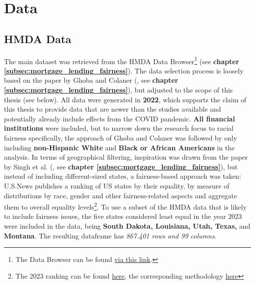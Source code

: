 \section{Data}\label{sec:Data}

\subsection{HMDA Data}\label{subsec:HMDA_Data}

The main dataset was retrieved from the HMDA Data Browser\footnote{The Data Browser can be found \href{https://ffiec.cfpb.gov/data-browser/data/2022?category=states}{via this link}.} (see \textbf{chapter \ref{subsec:mortgage_lending_fairness}}). 
The data selection process is loosely based on the paper by Ghoba and Colaner (\cite{Ghoba}, see \textbf{chapter \ref{subsec:mortgage_lending_fairness}}), but adjusted to the scope of this thesis (see below).
All data were generated in \textbf{2022}, which supports the claim of this thesis to provide data that are newer than the studies available and potentially already include effects from the COVID pandemic. \textbf{All financial institutions} were included, but to narrow down the research focus to racial fairness specifically, the approach of Ghoba and Colaner was followed by only including \textbf{non-Hispanic White} and \textbf{Black or African Americans} in the analysis. 
In terms of geographical filtering, inspiration was drawn from the paper by Singh et al. (\cite{Singh2022}, see \textbf{chapter \ref{subsec:mortgage_lending_fairness}}), but instead of including different-sized states, a fairness-based approach was taken: 
U.S.News publishes a ranking of US states by their equality, by measure of distributions by race, gender and other fairness-related aspects and aggregate them to overall equality levels\footnote{The 2023 ranking can be found \href{https://www.usnews.com/news/best-states/rankings/opportunity/equality?sort=rank-desc}{here}, the corresponding methodology \href{https://www.usnews.com/news/best-states/articles/methodology}{here}}. 
To use a subset of the HMDA data that is likely to include fairness issues, the five states considered least equal in the year 2023 were included in the data, being \textbf{South Dakota, Louisiana, Utah, Texas,} and \textbf{Montana}. The resulting dataframe has \textit{867.401 rows and 99 columns}.

